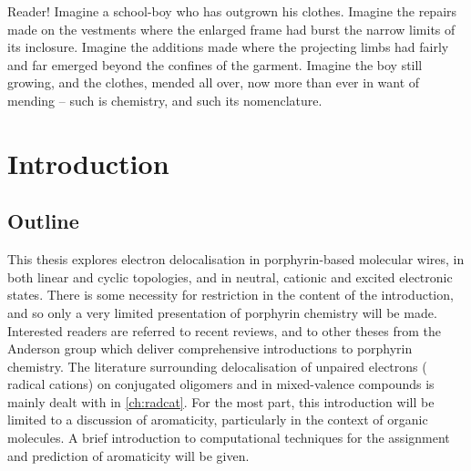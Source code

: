 

\begin{savequote}[8cm]
Reader! Imagine a school-boy who has outgrown his clothes. Imagine the repairs made on the vestments where the enlarged frame had burst the narrow limits of its inclosure. Imagine the additions made where the projecting limbs had fairly and far emerged beyond the confines of the garment. Imagine the boy still growing, and the clothes, mended all over, now more than ever in want of mending -- such is chemistry, and such its nomenclature.
\end{savequote}

\chapter{\label{ch:intro}Introduction} 

\minitoc

\section{Outline}

	This thesis explores electron delocalisation in porphyrin-based molecular wires, in both linear and cyclic topologies, and in neutral, cationic and excited electronic states. There is some necessity for restriction in the content of the introduction, and so only a very limited presentation of porphyrin chemistry will be made. Interested readers are referred to recent reviews,\autocite{Vicente2014,Tanaka2015,Wang2016,Hiroto2016} and to other theses from the Anderson group which deliver comprehensive introductions to porphyrin chemistry.\autocite{KondratiukThesis2013,LiuThesis2016,KamonsutthipaijitThesis2016} The literature surrounding delocalisation of unpaired electrons ( radical cations) on conjugated oligomers and in mixed-valence compounds is mainly dealt with in \autoref{ch:radcat}. For the most part, this introduction will be limited to a discussion of aromaticity, particularly in the context of organic molecules. A brief introduction to computational techniques for the assignment and prediction of aromaticity will be given.

